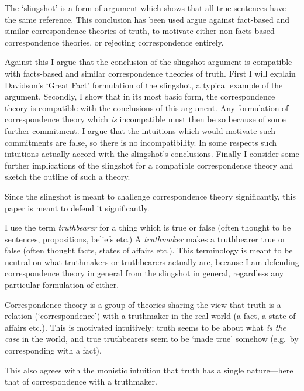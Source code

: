 The `slingshot' is a form of argument which shows that all true sentences have the same reference.
This conclusion has been used argue against fact-based and similar correspondence theories of truth, to motivate either non-facts based correspondence theories, or rejecting correspondence entirely.

Against this I argue that the conclusion of the slingshot argument is compatible with facts-based and similar correspondence theories of truth.
First I will explain Davidson's `Great Fact' formulation of the slingshot, a typical example of the argument.
Secondly, I show that in its most basic form, the correspondence theory is compatible with the conclusions of this argument.
Any formulation of correspondence theory which \emph{is} incompatible must then be so because of some further commitment.
I argue that the intuitions which would motivate such commitments are false, so there is no incompatibility.
In some respects such intuitions actually accord with the slingshot's conclusions.
Finally I consider some further implications of the slingshot for a compatible correspondence theory and sketch the outline of such a theory.

Since the slingshot is meant to challenge correspondence theory significantly, this paper is meant to defend it significantly.

I use the term \textit{truthbearer} for a thing which is true or false (often thought to be sentences, propositions, beliefs etc.)
A \textit{truthmaker} makes a truthbearer true or false (often thought facts, states of affairs etc.).
This terminology is meant to be neutral on what truthmakers or truthbearers actually are, because I am defending correspondence theory in general from the slingshot in general, regardless any particular formulation of either.

Correspondence theory is a group of theories sharing the view that truth is a relation (`correspondence') with a truthmaker in the real world (a fact, a state of affairs etc.).
This is motivated intuitively: truth seems to be about what \emph{is the case} in the world, and true truthbearers seem to be `made true' somehow (e.g.\ by corresponding with a fact).

This also agrees with the monistic intuition that truth has a single nature---here that of correspondence with a truthmaker.

